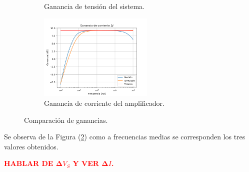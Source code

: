 \begin{figure}[H]
\begin{subfigure}{.49\textwidth}
	\caption{Ganancia de tensión del sistema.}
\end{subfigure}
\begin{subfigure}{.8\textwidth}
\centering
	\includegraphics[width=0.6\textwidth]{Imagenes/Ai.png}
	\caption{Ganancia de corriente del amplificador.}
	\label{fig:aicomp}
\end{subfigure}
\caption{Comparación de ganancias.}
\label{fig:ganancias}
\end{figure}

Se observa de la Figura (\ref{fig:ganancias}) como a frecuencias medias se corresponden los tres valores obtenidos. 

\begin{center}
	\Large{\textcolor{red}{\textbf{HABLAR DE $\mathbf\Delta V_S$ Y VER $\mathbf\Delta I$.}}}
\end{center}

